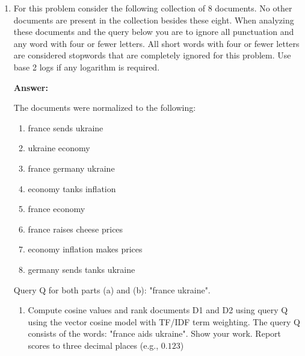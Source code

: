 \documentclass[11pt]{article}
\begin{document}
\begin{enumerate}
\begin{enumerate}
        \end{enumerate}


  \item For this problem consider the following collection of 8 documents. No other documents are present in the collection besides these eight. When analyzing these documents and the query below you are to ignore all punctuation and any word with four or fewer letters. All short words with four or fewer letters are considered stopwords that are completely ignored for this problem. Use base 2 logs if any logarithm is required.

        \textbf{Answer:}

        The documents were normalized to the following:

        \begin{enumerate}[label=D\arabic*:]
          \item france sends ukraine
          \item ukraine economy
          \item france germany ukraine
          \item economy tanks inflation
          \item france economy
          \item france raises cheese prices
          \item economy inflation makes prices
          \item germany sends tanks ukraine
        \end{enumerate}

        Query Q for both parts (a) and (b): "france ukraine".

        \begin{enumerate}
          \item Compute cosine values and rank documents D1 and D2 using query Q using the vector cosine model with TF/IDF term weighting. The query Q consists of the words: "france aids ukraine". Show your work. Report scores to three decimal places (e.g., $0.123$)


\end{enumerate}
\end{enumerate}
\end{document}
